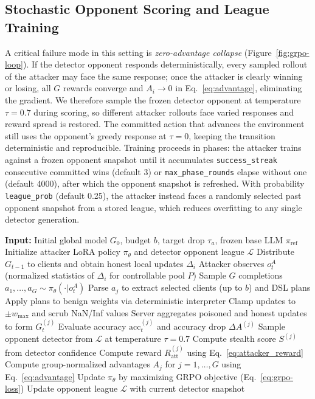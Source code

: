 \documentclass[conference,9pt]{IEEEtran}
\begin{document}
\subsection{Stochastic Opponent Scoring and League Training}
\label{sec:opponent-scoring}
A critical failure mode in this setting is \emph{zero-advantage collapse} (Figure~\ref{fig:grpo-loop}). If the detector opponent responds deterministically, every sampled rollout of the attacker may face the same response; once the attacker is clearly winning or losing, all $G$ rewards converge and $A_i \to 0$ in Eq.~\eqref{eq:advantage}, eliminating the gradient. We therefore sample the frozen detector opponent at temperature $\tau=0.7$ during scoring, so different attacker rollouts face varied responses and reward spread is restored. The committed action that advances the environment still uses the opponent's greedy response at $\tau=0$, keeping the transition deterministic and reproducible. Training proceeds in phases: the attacker trains against a frozen opponent snapshot until it accumulates \texttt{success\_streak} consecutive committed wins (default 3) or \texttt{max\_phase\_rounds} elapse without one (default 4000), after which the opponent snapshot is refreshed. With probability \texttt{league\_prob} (default 0.25), the attacker instead faces a randomly selected past opponent snapshot from a stored league, which reduces overfitting to any single detector generation.

\begin{algorithm}[ht]
\caption{Zero-Touch LLM-Directed Attacker Training via GRPO}
\label{alg:attacker}
\begin{algorithmic}[1]
\State \textbf{Input:} Initial global model $G_0$, budget $b$, target drop $\tau_a$, frozen base LLM $\pi_{\mathrm{ref}}$
\State Initialize attacker LoRA policy $\pi_\theta$ and detector opponent league $\mathcal{L}$
    \State Distribute $G_{t-1}$ to clients and obtain honest local updates $\Delta_i$
    \State Attacker observes $o_t^A$ (normalized statistics of $\Delta_i$ for controllable pool $P$)
    \State Sample $G$ completions $a_1, \dots, a_G \sim \pi_\theta(\cdot|o_t^A)$
        \State Parse $a_j$ to extract selected clients (up to $b$) and DSL plans
        \State Apply plans to benign weights via deterministic interpreter
        \State Clamp updates to $\pm w_{\max}$ and scrub NaN/Inf values
        \State Server aggregates poisoned and honest updates to form $G_t^{(j)}$
        \State Evaluate accuracy $\mathrm{acc}_t^{(j)}$ and accuracy drop $\Delta A^{(j)}$
        \State Sample opponent detector from $\mathcal{L}$ at temperature $\tau=0.7$
        \State Compute stealth score $S^{(j)}$ from detector confidence
        \State Compute reward $R_{\mathrm{att}}^{(j)}$ using Eq.~\eqref{eq:attacker_reward}
    \EndFor
    \State Compute group-normalized advantages $A_j$ for $j=1,\dots,G$ using Eq.~\eqref{eq:advantage}
    \State Update $\pi_\theta$ by maximizing GRPO objective (Eq.~\eqref{eq:grpo-loss})
        \State Update opponent league $\mathcal{L}$ with current detector snapshot
    \EndIf
\EndFor
\end{algorithmic}
\end{algorithm}
\end{document}
